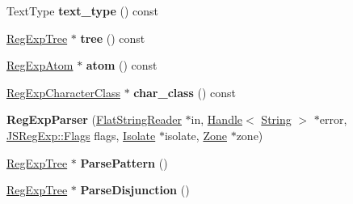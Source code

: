 \begin{DoxyCompactItemize}
\item 
Text\+Type {\bfseries text\+\_\+type} () const \hypertarget{classv8_1_1internal_1_1_b_a_s_e___e_m_b_e_d_d_e_d_a770faba2bc084952e2ed6bfe6f6440bf}{}\label{classv8_1_1internal_1_1_b_a_s_e___e_m_b_e_d_d_e_d_a770faba2bc084952e2ed6bfe6f6440bf}

\item 
\hyperlink{classv8_1_1internal_1_1_reg_exp_tree}{Reg\+Exp\+Tree} $\ast$ {\bfseries tree} () const \hypertarget{classv8_1_1internal_1_1_b_a_s_e___e_m_b_e_d_d_e_d_a6a8531427cb186b53e929f77fa940a0e}{}\label{classv8_1_1internal_1_1_b_a_s_e___e_m_b_e_d_d_e_d_a6a8531427cb186b53e929f77fa940a0e}

\item 
\hyperlink{classv8_1_1internal_1_1_reg_exp_atom}{Reg\+Exp\+Atom} $\ast$ {\bfseries atom} () const \hypertarget{classv8_1_1internal_1_1_b_a_s_e___e_m_b_e_d_d_e_d_ac39d8d7dc05f80ec63cddea655541f57}{}\label{classv8_1_1internal_1_1_b_a_s_e___e_m_b_e_d_d_e_d_ac39d8d7dc05f80ec63cddea655541f57}

\item 
\hyperlink{classv8_1_1internal_1_1_reg_exp_character_class}{Reg\+Exp\+Character\+Class} $\ast$ {\bfseries char\+\_\+class} () const \hypertarget{classv8_1_1internal_1_1_b_a_s_e___e_m_b_e_d_d_e_d_aed8551b74c3a5ef7bda93e86d430abd3}{}\label{classv8_1_1internal_1_1_b_a_s_e___e_m_b_e_d_d_e_d_aed8551b74c3a5ef7bda93e86d430abd3}

\item 
{\bfseries Reg\+Exp\+Parser} (\hyperlink{classv8_1_1internal_1_1_flat_string_reader}{Flat\+String\+Reader} $\ast$in, \hyperlink{classv8_1_1internal_1_1_handle}{Handle}$<$ \hyperlink{classv8_1_1internal_1_1_string}{String} $>$ $\ast$error, \hyperlink{classv8_1_1base_1_1_flags}{J\+S\+Reg\+Exp\+::\+Flags} flags, \hyperlink{classv8_1_1internal_1_1_isolate}{Isolate} $\ast$isolate, \hyperlink{classv8_1_1internal_1_1_zone}{Zone} $\ast$zone)\hypertarget{classv8_1_1internal_1_1_b_a_s_e___e_m_b_e_d_d_e_d_ac1785bc494470cf2be408df0da014954}{}\label{classv8_1_1internal_1_1_b_a_s_e___e_m_b_e_d_d_e_d_ac1785bc494470cf2be408df0da014954}

\item 
\hyperlink{classv8_1_1internal_1_1_reg_exp_tree}{Reg\+Exp\+Tree} $\ast$ {\bfseries Parse\+Pattern} ()\hypertarget{classv8_1_1internal_1_1_b_a_s_e___e_m_b_e_d_d_e_d_ac0785d53bb61ddc14e62819601a0cb85}{}\label{classv8_1_1internal_1_1_b_a_s_e___e_m_b_e_d_d_e_d_ac0785d53bb61ddc14e62819601a0cb85}

\item 
\hyperlink{classv8_1_1internal_1_1_reg_exp_tree}{Reg\+Exp\+Tree} $\ast$ {\bfseries Parse\+Disjunction} ()\hypertarget{classv8_1_1internal_1_1_b_a_s_e___e_m_b_e_d_d_e_d_a51505a06bcc903a670b0fd5126b57ecc}{}\label{classv8_1_1internal_1_1_b_a_s_e___e_m_b_e_d_d_e_d_a51505a06bcc903a670b0fd5126b57ecc}


\end{DoxyCompactItemize}
